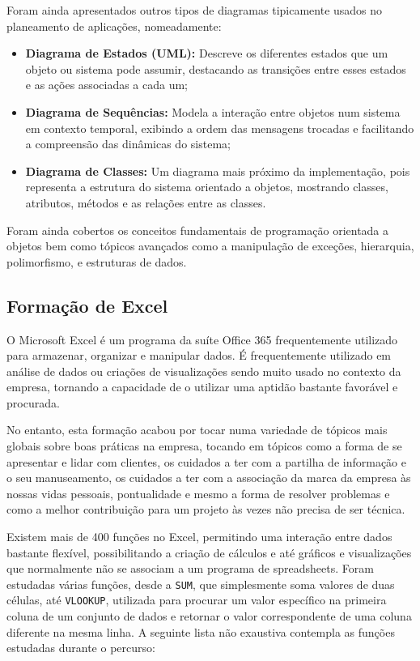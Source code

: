       Foram ainda apresentados outros tipos de diagramas tipicamente usados no planeamento de aplicações, nomeadamente:
      \begin{itemize}
          \item \textbf{Diagrama de Estados (UML):} Descreve os diferentes estados que um objeto ou sistema pode assumir, destacando as transições entre esses estados e as ações associadas a cada um;
          
          \item \textbf{Diagrama de Sequências:} Modela a interação entre objetos num sistema em contexto temporal, exibindo a ordem das mensagens trocadas e facilitando a compreensão das dinâmicas do sistema;

          \item \textbf{Diagrama de Classes:} Um diagrama mais próximo da implementação, pois representa a estrutura do sistema orientado a objetos, mostrando classes, atributos, métodos e as relações entre as classes.
      \end{itemize}    

      Foram ainda cobertos os conceitos fundamentais de programação orientada a objetos bem como tópicos avançados como a manipulação de exceções, hierarquia, polimorfismo, e estruturas de dados. 

    \subsection{Formação de Excel}\label{subsec:excel}

      O Microsoft Excel é um programa da suíte Office 365 frequentemente utilizado para armazenar, organizar e manipular dados. É frequentemente utilizado em análise de dados ou criações de visualizações sendo muito usado no contexto da empresa, tornando a capacidade de o utilizar uma aptidão bastante favorável e procurada. 

      No entanto, esta formação acabou por tocar numa variedade de tópicos mais globais sobre boas práticas na empresa, tocando em tópicos como a forma de se apresentar e lidar com clientes, os cuidados a ter com a partilha de informação e o seu manuseamento, os cuidados a ter com a associação da marca da empresa às nossas vidas pessoais, pontualidade e mesmo a forma de resolver problemas e como a melhor contribuição para um projeto às vezes não precisa de ser técnica.

      Existem mais de 400 funções no Excel, permitindo uma interação entre dados bastante flexível, possibilitando a criação de cálculos e até gráficos e visualizações que normalmente não se associam a um programa de spreadsheets. Foram estudadas várias funções, desde a \texttt{SUM}, que simplesmente soma valores de duas células, até \texttt{VLOOKUP}, utilizada para procurar um valor específico na primeira coluna de um conjunto de dados e retornar o valor correspondente de uma coluna diferente na mesma linha. A seguinte lista não exaustiva contempla as funções estudadas durante o percurso:  

